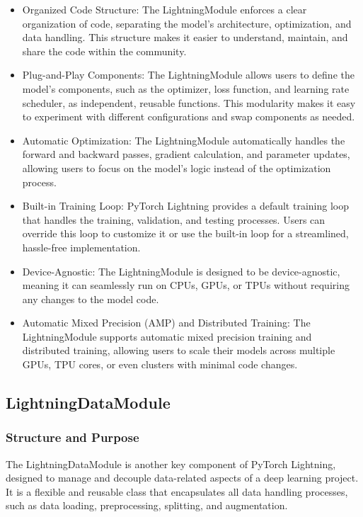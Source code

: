 \documentclass[12pt]{article}
\begin{document}
\begin{itemize}
    \item Organized Code Structure: The LightningModule enforces a clear organization of code, separating the model's architecture, optimization, and data handling. This structure makes it easier to understand, maintain, and share the code within the community.
    \item Plug-and-Play Components: The LightningModule allows users to define the model's components, such as the optimizer, loss function, and learning rate scheduler, as independent, reusable functions. This modularity makes it easy to experiment with different configurations and swap components as needed.
    \item Automatic Optimization: The LightningModule automatically handles the forward and backward passes, gradient calculation, and parameter updates, allowing users to focus on the model's logic instead of the optimization process.
    \item Built-in Training Loop: PyTorch Lightning provides a default training loop that handles the training, validation, and testing processes. Users can override this loop to customize it or use the built-in loop for a streamlined, hassle-free implementation.
    \item Device-Agnostic: The LightningModule is designed to be device-agnostic, meaning it can seamlessly run on CPUs, GPUs, or TPUs without requiring any changes to the model code.
    \item Automatic Mixed Precision (AMP) and Distributed Training: The LightningModule supports automatic mixed precision training and distributed training, allowing users to scale their models across multiple GPUs, TPU cores, or even clusters with minimal code changes.
\end{itemize}

\subsection{LightningDataModule}

\subsubsection{Structure and Purpose}

The LightningDataModule is another key component of PyTorch Lightning, designed to manage and decouple data-related aspects of a deep learning project.
It is a flexible and reusable class that encapsulates all data handling processes, such as data loading, preprocessing, splitting, and augmentation.
\end{document}
